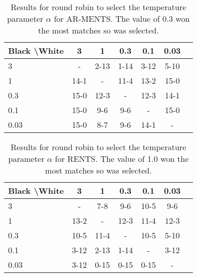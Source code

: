     \begin{table*}[]
    \centering
        \begin{tabular}{l|cccccc}
            \textbf{Black \textbackslash White}     & 3  & 1   & 0.3   & 0.1    & 0.03    \\ 
            \hline
                                    3            & -     	&  2-13 		& 1-14  		& 3-12  		& 5-10  		\\
                                    1            &  14-1 		& -     	& 11-4 		& 13-2  		& 15-0  		\\
                                    0.3          &  15-0  	&  12-3  	&   -   &  12-3 		& 14-1  		\\
                                    0.1          &   15-0		&  9-6 		&  9-6 		& -     	&  15-0 		\\
                                    0.03         &   15-0		&  8-7 		&  9-6 		& 14-1  		&   -   	\\    
        \end{tabular}
        \caption{Results for round robin to select the temperature parameter $\alpha$ for AR-MENTS. The value of 0.3 won the most matches so was selected. \label{tab:x040}}
    \end{table*}
    
    \begin{table*}[]
    \centering
        \begin{tabular}{l|cccccc}
            \textbf{Black \textbackslash White}     & 3  & 1   & 0.3   & 0.1    & 0.03    \\ 
            \hline
                                    3            & -     	&   	7-8	&  9-6 		&  10-5 		&  9-6 		\\
                                    1            &  13-2 		& -     	& 12-3 		& 11-4  		&  12-3 		\\
                                    0.3          &   10-5 	& 11-4   	&   -   &  10-5 		&  5-10 		\\
                                    0.1          &   3-12		&  2-13 		& 1-14  		& -     	&  3-12 		\\
                                    0.03         &   3-12		&  0-15 		&  0-15 		&  0-15 		&   -   	\\    
        \end{tabular}
        \caption{Results for round robin to select the temperature parameter $\alpha$ for RENTS. The value of 1.0 won the most matches so was selected. \label{tab:w050}}
    \end{table*}
    
